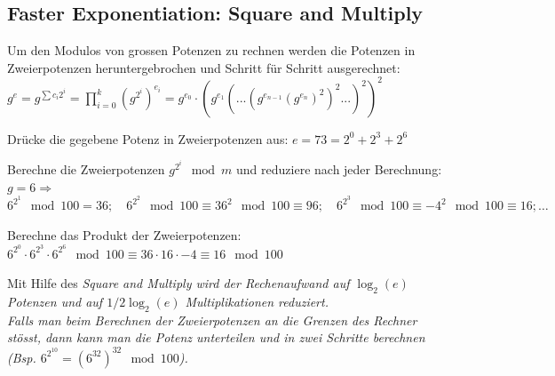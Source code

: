 \subsection{Faster Exponentiation: Square and Multiply}
Um den Modulos von grossen Potenzen zu rechnen werden die Potenzen in Zweierpotenzen heruntergebrochen und Schritt für Schritt ausgerechnet:\\
$g^e=g^{\sum c_i 2^i}=\prod_{i=0}^k \left(g^{2^i}\right)^{e_i}=g^{e_0}\cdot\left(g^{e_1}\left(...\left(g^{e_{n-1}}\left(g^{e_n}\right)^2\right)^2...\right)^2\right)^2$
\begin{aufzaehlung}
\item Drücke die gegebene Potenz in Zweierpotenzen aus: $e=73=2^0+2^3+2^6$
\item Berechne die Zweierpotenzen $g^{2^i} \mod m$ und reduziere nach jeder Berechnung: $g=6\Rightarrow$\\ 
$6^{2^1} \mod 100 = 36;\quad 6^{2^2} \mod 100 \equiv 36^2  \mod 100 \equiv 96;\quad  6^{2^3} \mod 100 \equiv {-4}^2 \mod 100 \equiv 16; \ldots$
\item Berechne das Produkt der Zweierpotenzen: $6^{2^0}\cdot6^{2^3}\cdot6^{2^6}\mod 100\equiv 36 \cdot 16 \cdot -4 \equiv 16\mod 100$
\end{aufzaehlung}
Mit Hilfe des \em Square and Multiply \em wird der Rechenaufwand auf $\log_2(e)$ Potenzen und auf $1/2 \log_2(e)$ Multiplikationen reduziert. \\
Falls man beim Berechnen der Zweierpotenzen an die Grenzen des Rechner stösst, dann kann man die Potenz unterteilen und in zwei Schritte berechnen 
(Bsp. $6^{2^{10}}=(6^{32})^{32} \mod 100$).

